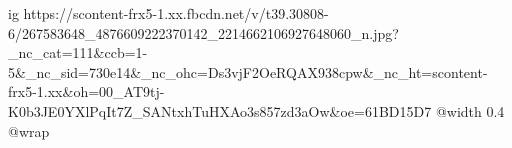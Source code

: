  
 
 
 
 

\ifcmt
  ig https://scontent-frx5-1.xx.fbcdn.net/v/t39.30808-6/267583648_4876609222370142_2214662106927648060_n.jpg?_nc_cat=111&ccb=1-5&_nc_sid=730e14&_nc_ohc=Ds3vjF2OeRQAX938cpw&_nc_ht=scontent-frx5-1.xx&oh=00_AT9tj-K0b3JE0YXlPqIt7Z_SANtxhTuHXAo3s857zd3aOw&oe=61BD15D7
  @width 0.4
  @wrap 
\fi

